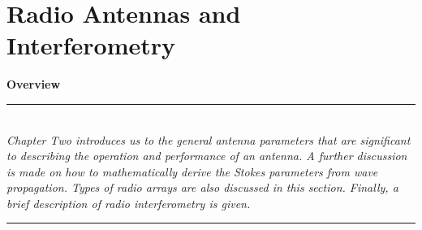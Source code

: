 \chapter{Radio Antennas and Interferometry}\label{Chapter2}  %



\textbf{Overview}\\
\par\noindent\rule{\textwidth}{0.4pt}\\
\textit{Chapter Two introduces us to the general antenna parameters that are significant to describing the operation and performance of an antenna. A further
discussion is made on how to mathematically derive the Stokes parameters from wave propagation. Types of radio arrays are also discussed in this section. 
Finally, a brief description of radio interferometry is given.}
\par\noindent\rule{\textwidth}{0.4pt}\\


